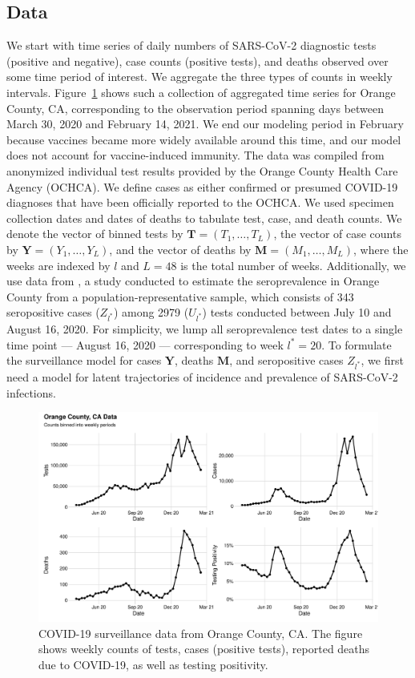 \subsection{Data}
\label{ch_4:subsec:data}
We start with time series of daily numbers of SARS-CoV-2 diagnostic tests (positive and negative), case counts (positive tests), and deaths observed over some time period of interest.
We aggregate the three types of counts in weekly intervals.
Figure~\ref{ch_4:oc:data} shows such a collection of aggregated time series for Orange County, CA, corresponding to the observation period spanning days between March 30, 2020 and February 14, 2021.
We end our modeling period in February because vaccines became more widely available around this time, and our model does not account for vaccine-induced immunity.
The data was compiled from anonymized individual test results provided by the Orange County Health Care Agency (OCHCA).
We define cases as either confirmed or presumed COVID-19 diagnoses that have been officially reported to the OCHCA.
We used specimen collection dates and dates of deaths to tabulate test, case, and death counts.
We denote the vector of binned tests by $\mathbf{T} = (T_1, \dots, T_L)$, the vector of case counts by
$\mathbf{Y} = (Y_1, \dots, Y_L)$, and the vector of deaths by $\mathbf{M} = (M_1, \dots, M_L)$, where the weeks are indexed by $l$ and $L = 48$ is the total number of weeks.
Additionally, we use data from \cite{Bruckner2021}, a study conducted to estimate the seroprevalence in Orange County from a population-representative sample, which consists of 343 seropositive cases ($Z_{l^*}$) among 2979 ($U_{l^*}$) tests conducted between July 10 and August 16, 2020.
For simplicity, we lump all seroprevalence test dates to a single time point --- August 16, 2020 --- corresponding to week $l^*=20$.
To formulate the surveillance model for cases $\mathbf{Y}$, deaths $\mathbf{M}$, and seropositive cases $Z_{l^*}$, we first need a model for latent trajectories of incidence and prevalence of SARS-CoV-2 infections.

\begin{figure}[htbp]
\includegraphics[width=1.0\columnwidth]{binned_data_plot}
    \caption[COVID-19 surveillance data from Orange County, CA.]{
COVID-19 surveillance data from Orange County, CA.
The figure shows weekly counts of tests, cases (positive tests), reported deaths due to COVID-19, as well as testing positivity.}
\label{ch_4:oc:data}
\end{figure}

